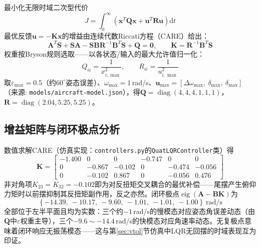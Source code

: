 最小化无限时域二次型代价
\begin{equation}
    J = \int_0^{\infty}\left(\mathbf{x}^T\mathbf{Q}\mathbf{x} + \mathbf{u}^T\mathbf{R}\mathbf{u}\right)\mathrm{d}t
    \label{eq:lqr_cost}
\end{equation}
最优反馈$\mathbf{u}=-\mathbf{K}\mathbf{x}$的增益由连续代数Riccati方程（CARE）给出：
\begin{equation}
    \mathbf{A}^T\mathbf{S} + \mathbf{S}\mathbf{A} - \mathbf{S}\mathbf{B}\mathbf{R}^{-1}\mathbf{B}^T\mathbf{S} + \mathbf{Q} = \mathbf{0},
    \qquad
    \mathbf{K} = \mathbf{R}^{-1}\mathbf{B}^T\mathbf{S}
    \label{eq:care}
\end{equation}
权重按Bryson规则选取——以各状态/输入的最大允许值归一化：
\begin{equation}
    Q_{ii} = \frac{1}{x_{i,\max}^2},\qquad R_{ii} = \frac{1}{u_{i,\max}^2}
    \label{eq:bryson}
\end{equation}
取$\varepsilon_{\max}=0.5$（约$60^\circ$姿态误差）、$\omega_{\max}=1$\,rad/s、$\mathbf{u}_{\max}=[\Delta\omega_{\max},\ \delta_{\max},\ \delta_{\max}]$（来源: \texttt{models/aircraft-model.json}），得$\mathbf{Q}=\operatorname{diag}(4,4,4,1,1,1)$，$\mathbf{R}=\operatorname{diag}(2.04,5.25,5.25)$。

\subsection{增益矩阵与闭环极点分析}
\label{sec:lqr_poles}

数值求解CARE（仿真实现：\texttt{controllers.py}的\texttt{QuatLQRController}类）得
\begin{equation}
    \mathbf{K} =
    \begin{bmatrix}
        -1.400 & 0 & 0 & -0.747 & 0 & 0 \\
        0 & -0.867 & -0.102 & 0 & -0.474 & -0.056 \\
        0 & -0.102 & 0.867 & 0 & -0.056 & 0.476
    \end{bmatrix}
    \label{eq:lqr_K}
\end{equation}
非对角项$K_{23}=K_{32}=-0.102$即为对反扭矩交叉耦合的最优补偿——尾摆产生俯仰力矩时以前摆抑制其反扭矩副作用，反之亦然。闭环极点$\operatorname{eig}(\mathbf{A}-\mathbf{B}\mathbf{K})$为
\begin{equation}
    \left\{-14.39,\ -10.17,\ -9.60,\ -1.01,\ -1.01,\ -1.00\right\}\ \text{rad/s}
    \label{eq:lqr_poles}
\end{equation}
全部位于左半平面且均为实数：三个约$-1$\,rad/s的慢模态对应姿态角误差动态（由$\mathbf{Q}$中$\varepsilon$权重主导），三个$-9.6\sim-14.4$\,rad/s的快模态对应角速率动态。无复极点意味着闭环响应无振荡模态——这与第\ref{sec:vtol}节仿真中LQR无回摆的时域表现互为印证。

